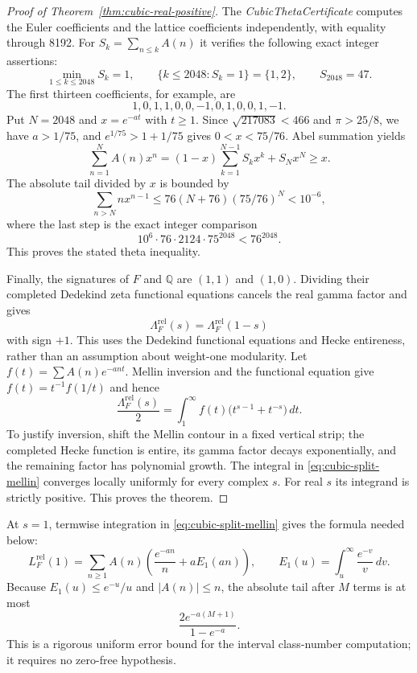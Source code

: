 \documentclass[11pt]{article}
\theoremstyle{remark}\newtheorem{remark}[theorem]{Remark}
\begin{document}
\begin{proof}[Proof of Theorem~\ref{thm:cubic-real-positive}]
The \emph{CubicThetaCertificate} computes the Euler coefficients and the lattice coefficients independently, with equality through 8192.
For $S_k=\sum_{n\le k}A(n)$ it verifies the following exact integer assertions:
\[
 \min_{1\le k\le2048}S_k=1,\qquad
 \{k\le2048:S_k=1\}=\{1,2\},\qquad S_{2048}=47.
\]
The first thirteen coefficients, for example, are
\[
 1,0,1,1,0,0,-1,0,1,0,0,1,-1.
\]
Put $N=2048$ and $x=e^{-at}$ with $t\ge1$.
Since $\sqrt{217083}<466$ and $\pi>25/8$, we have $a>1/75$, and $e^{1/75}>1+1/75$ gives $0<x<75/76$.
Abel summation yields
\[
 \sum_{n=1}^N A(n)x^n
   =(1-x)\sum_{k=1}^{N-1}S_kx^k+S_Nx^N\ge x.
\]
The absolute tail divided by $x$ is bounded by
\[
 \sum_{n>N}n x^{n-1}
  \le76(N+76)(75/76)^N<10^{-6},
\]
where the last step is the exact integer comparison
\[
 10^6\cdot76\cdot2124\cdot75^{2048}<76^{2048}.
\]
This proves the stated theta inequality.

Finally, the signatures of $F$ and $\mathbb Q$ are $(1,1)$ and $(1,0)$.
Dividing their completed Dedekind zeta functional equations cancels the real gamma factor and gives
\[
 \Lambda_F^{\mathrm{rel}}(s)=\Lambda_F^{\mathrm{rel}}(1-s)
\]
with sign $+1$.
This uses the Dedekind functional equations and Hecke entireness, rather than an assumption about weight-one modularity.
Let $f(t)=\sum A(n)e^{-ant}$.
Mellin inversion and the functional equation give $f(t)=t^{-1}f(1/t)$ and hence
\begin{equation}\label{eq:cubic-split-mellin}
 \frac{\Lambda_F^{\mathrm{rel}}(s)}2
  =\int_1^\infty f(t)\bigl(t^{s-1}+t^{-s}\bigr)\,dt.
\end{equation}
To justify inversion, shift the Mellin contour in a fixed vertical strip; the completed Hecke function is entire, its gamma factor decays exponentially, and the remaining factor has polynomial growth.
The integral in \eqref{eq:cubic-split-mellin} converges locally uniformly for every complex $s$.
For real $s$ its integrand is strictly positive.
This proves the theorem.
\end{proof}

At $s=1$, termwise integration in \eqref{eq:cubic-split-mellin} gives the formula needed below:
\begin{equation}\label{eq:cubic-L-one}
 L_F^{\mathrm{rel}}(1)
 =\sum_{n\ge1}A(n)\left(\frac{e^{-an}}n+aE_1(an)\right),
 \qquad E_1(u)=\int_u^\infty\frac{e^{-v}}v\,dv.
\end{equation}
Because $E_1(u)\le e^{-u}/u$ and $|A(n)|\le n$, the absolute tail after $M$ terms is at most
\[
 \frac{2e^{-a(M+1)}}{1-e^{-a}}.
\]
This is a rigorous uniform error bound for the interval class-number computation; it requires no zero-free hypothesis.
\end{document}
